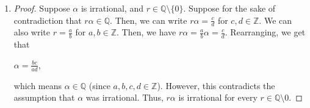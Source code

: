 \documentclass[12pt]{article}
\begin{document}
\begin{enumerate}[start = 1, label = {\bfseries Question \arabic*}, leftmargin=1in]
\item \begin{proof}
    Suppose $\alpha$ is irrational, and $r\in \mathbb{Q}\setminus\{0\}$. Suppose for the sake of contradiction that $r\alpha \in \mathbb{Q}$. Then,
    we can write $r\alpha = \frac{c}{d}$ for $c,d\in \mathbb{Z}$. We can also write $r=\frac{a}{b}$ for $a,b\in \mathbb{Z}$. Then, we have $r\alpha = \frac{a}{b}\alpha= \frac{c}{d}$. Rearranging, we get that \begin{center}
        $\alpha = \frac{bc}{ad}$,
    \end{center} which means $\alpha \in \mathbb{Q}$ (since $a,b,c,d\in \mathbb{Z}$). However, this contradicts the assumption that $\alpha$ was irrational. Thus, $r\alpha$ is irrational for every $r\in \mathbb{Q}\setminus {0}$.
\end{proof}


\end{enumerate}
\end{document}
